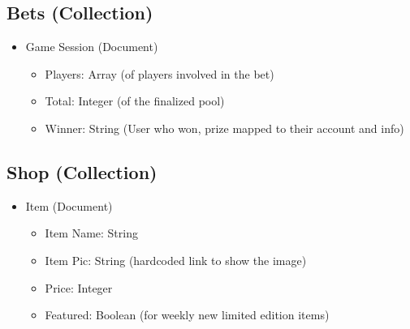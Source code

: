 \subsection{Bets (Collection)}
\begin{itemize}
    \item Game Session (Document)
    \begin{itemize}
        \item Players: Array (of players involved in the bet)
        \item Total: Integer (of the finalized pool)
        \item Winner: String (User who won, prize mapped to their account and info)
    \end{itemize}
\end{itemize}

\subsection{Shop (Collection)}
\begin{itemize}
    \item Item (Document)
    \begin{itemize}
        \item Item Name: String
        \item Item Pic: String (hardcoded link to show the image)
        \item Price: Integer
        \item Featured: Boolean (for weekly new limited edition items)
    \end{itemize}
\end{itemize}


